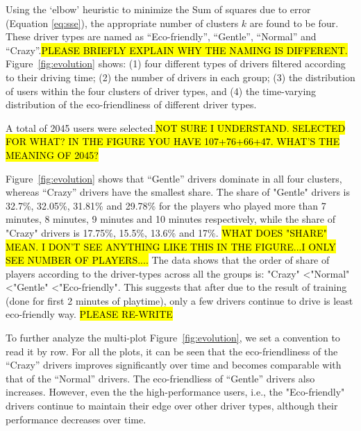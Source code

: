 \documentclass[preprint,authoryear,12pt]{elsarticle}
\begin{document}
Using the `elbow' heuristic to minimize the Sum of squares due to error (Equation \ref{eq:sse}), the appropriate number of clusters $k$ are found to be four.
These driver types are named as ``Eco-friendly'', ``Gentle'', ``Normal'' and ``Crazy''.\hl{PLEASE BRIEFLY EXPLAIN WHY THE NAMING IS DIFFERENT.} Figure~\ref{fig:evolution} shows: (1) four different types of drivers filtered according to their driving time; (2) the number of drivers in each group; (3) the distribution of users within the four clusters of driver types, and (4) the time-varying distribution of the eco-friendliness of different driver types.

 A total of 2045 users were selected.\hl{NOT SURE I UNDERSTAND. SELECTED FOR WHAT? IN THE FIGURE YOU HAVE 107+76+66+47. WHAT'S THE MEANING OF 2045?}
 

Figure~\ref{fig:evolution} shows that ``Gentle'' drivers dominate in all four clusters, whereas ``Crazy'' drivers have the smallest share. The share of "Gentle" drivers is 32.7\%, 32.05\%, 31.81\% and 29.78\% for the players who played more than 7 minutes, 8 minutes, 9 minutes and 10 minutes respectively, while the share of "Crazy" drivers is 17.75\%, 15.5\%, 13.6\% and 17\%. \hl{WHAT DOES "SHARE" MEAN. I DON'T SEE ANYTHING LIKE THIS IN THE FIGURE...I ONLY SEE NUMBER OF PLAYERS....}
The data shows that the order of share of players according to the driver-types across all the groups is:  "Crazy" \textless "Normal" \textless "Gentle" \textless "Eco-friendly". This suggests that after due to the result of training (done for first 2 minutes of playtime), only a few drivers continue to drive is least eco-friendly way.
\hl{PLEASE RE-WRITE }

To further analyze the multi-plot Figure~\ref{fig:evolution}, we set a convention to read it by row. For all the plots, it can be seen that the eco-friendliness of the ``Crazy'' drivers improves significantly over time and becomes comparable with that of the ``Normal'' drivers. The eco-friendliess of ``Gentle'' drivers also increases. However, even the the high-performance users, i.e., the "Eco-friendly" drivers continue to maintain their edge over other driver types, although their performance decreases over time. 
\end{document}
